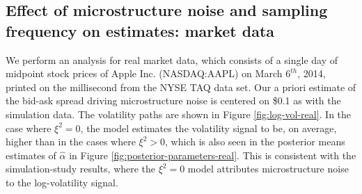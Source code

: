 \documentclass[10pt]{article}
\newcommand{\halpha}{\hat{\alpha}}
\begin{document}
\subsection{ Effect of microstructure noise and sampling frequency on estimates: market data }

We perform an analysis for real market data, which consists of a single day of midpoint stock prices of Apple Inc. (NASDAQ:AAPL) on March $6^{th}$, 2014, printed on the millisecond from the NYSE TAQ data set.  Our a priori estimate of the bid-ask spread driving microstructure noise is centered on \$0.1 as with the simulation data. The volatility paths are shown in Figure \ref{fig:log-vol-real}.  In the case where $\xi^2 = 0$, the model estimates the volatility signal to be, on average, higher than in the cases where $\xi^2 > 0$, which is also seen in the posterior means estimates of $\halpha$ in Figure \ref{fig:posterior-parameters-real}. This is consistent with the simulation-study results, where the $\xi^2 = 0$ model attributes microstructure noise to the log-volatility signal.
\end{document}
